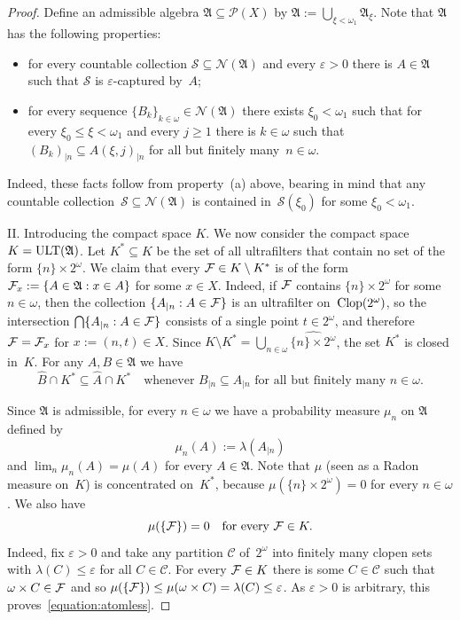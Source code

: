 \documentclass[12pt]{amsart}
\newcommand{\FF}{\protect{\mathcal F}}
\newcommand{\sm}{\setminus}
\newcommand{\sub}{\subseteq}
\newcommand\eps{\ensuremath{\varepsilon}}
\newcommand{\alg}{\mathfrak A}
\newcommand{\NN}{{\mathcal N}}
\newcommand{\PP}{{\mathcal P}}
\newcommand{\ult}{{\rm ULT}}
\newcommand{\clop}{\protect{\rm Clop} }
\newcommand{\0}{\protect{\bf 0}}
\newcommand{\1}{\protect{\bf 1}}
\theoremstyle{definition}
\theoremstyle{remark}
\numberwithin{equation}{section}
\def\epsilon{\varepsilon}
\begin{document}
\begin{proof}
Define an admissible algebra $\alg \sub \PP(X)$ by $\alg:=\bigcup_{\xi<\omega_1}\alg_\xi$.
Note that $\alg$ has the following properties:
\begin{itemize}
\item[(i)] for every countable collection $\mathcal{S} \sub \NN(\alg)$ and every $\eps>0$ there is $A\in\alg$
such that $\mathcal{S}$ is $\eps$-captured by~$A$;
\item[(ii)] for every sequence $\{B_k\}_{k\in \omega}\in \NN(\alg)$ there exists $\xi_0<\omega_1$ such that
for every $\xi_0\leq\xi<\omega_1$ and every $j\ge 1$ there is $k\in \omega$ such that 
$(B_k)_{|n}\sub A(\xi,j)_{|n}$ for all but finitely many~$n\in \omega$.
\end{itemize}
Indeed, these facts follow from property~(a) above, bearing in mind that any countable collection~$\mathcal{S}\sub \NN(\alg)$ 
is contained in~$\mathcal{S}(\xi_0)$ for some $\xi_0 < \omega_1$.

\smallskip

{\sc II. Introducing the compact space $K$.}
We now consider the compact space $K=\ult(\alg)$. 
Let $K^* \sub K$ be the set of all ultrafilters that contain no set of the form $\{n\}\times 2^\omega$. 
We claim that every $\FF \in K \sm K^*$ is of the form $\FF_x:=\{A\in \alg:x\in A\}$ for some $x\in X$.
Indeed, if $\FF$ contains $\{n\}\times 2^\omega$ for some $n\in \omega$,
then the collection $\{A_{|n}: A\in \FF\}$ 
is an ultrafilter on~$\clop(2^\omega)$, so the intersection 
$\bigcap \{A_{|n}: A\in \FF\}$ consists of a single point $t\in 2^\omega$, and  
therefore $\FF=\FF_x$ for $x:=(n,t)\in X$. 
Since $K \sm K^*=\bigcup_{n\in \omega} \widehat{\{n\}\times 2^\omega}$, 
the set $K^*$ is closed in~$K$. For any $A,B \in \alg$ we have
\begin{equation}\label{star}
\widehat{B}\cap K^* \sub \widehat{A}\cap K^* \quad \mbox{whenever }
B_{|n} \sub A_{|n} \mbox{ for all but finitely many }n\in \omega.
\end{equation}

Since $\alg$ is admissible, for every $n\in \omega$ we have a probability
measure $\mu_n$ on $\alg$ defined by 
$$
	\mu_n(A):=\lambda(A_{|n})
$$ 
and $\lim_{n} \mu_n(A)= \mu(A)$ for every $A\in \alg$.
Note that $\mu$ (seen as a Radon measure on~$K$) is concentrated on~$K^\ast$, because
$\mu(\{n\}\times 2^\omega)=0$ for every $n\in \omega$. We also have
\begin{equation}\label{equation:atomless}
	\mu(\{\FF\})=0 \quad \mbox{for every }\FF \in K.
\end{equation} 
Indeed, fix $\epsilon>0$ and take any partition $\mathcal{C}$ of~$2^\omega$ into finitely many clopen
sets with $\lambda(C)\leq \epsilon$ for all $C\in \mathcal{C}$. For every $\FF\in K$ there is
some $C\in \mathcal{C}$ such that $\omega \times C \in \FF$  
and so $\mu(\{\FF\})\leq \mu(\omega \times C) = \lambda(C) \leq \epsilon$. 
As $\epsilon>0$ is arbitrary, this proves~\eqref{equation:atomless}.


\end{proof}
\end{document}
